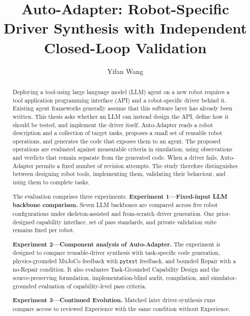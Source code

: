 \makeatletter
\renewcommand {\@degree@string} {Master of Science}
\makeatother

\title{Auto-Adapter: Robot-Specific Driver Synthesis with Independent Closed-Loop Validation}
\author{Yifan Wang}

\maketitle
\makedeclaration

\begin{abstract}
Deploying a tool-using large language model (LLM) agent on a new robot requires
a tool application programming interface (API) and a robot-specific driver
behind it. Existing agent frameworks generally assume that this software layer
has already been written. This thesis asks whether an LLM can instead design
the API, define how it should be tested, and implement the driver itself.
Auto-Adapter reads a robot description and a collection of target tasks,
proposes a small set of reusable robot operations, and generates the code that
exposes them to an agent. The proposed operations are evaluated against
measurable criteria in simulation, using observations and verdicts that remain
separate from the generated code. When a driver fails, Auto-Adapter permits a
fixed number of revision attempts. The study therefore distinguishes between
designing robot tools, implementing them, validating their behaviour, and
using them to complete tasks.

The evaluation comprises three experiments.
\textbf{Experiment 1---Fixed-input LLM backbone comparison.} Seven LLM
backbones are compared across five robot configurations under skeleton-assisted
and from-scratch driver generation. One prior-designed capability interface,
set of pass standards, and private validation suite remains fixed per robot.

\textbf{Experiment 2---Component analysis of Auto-Adapter.} The experiment is
designed to compare reusable-driver synthesis with task-specific code
generation, physics-grounded MuJoCo feedback with \texttt{pytest} feedback, and
bounded Repair with a no-Repair condition. It also evaluates Task-Grounded
Capability Design and the source-preserving formulation, implementation-blind
audit, compilation, and simulator-grounded evaluation of capability-level pass
criteria.

\textbf{Experiment 3---Continued Evolution.} Matched later driver-synthesis
runs compare access to reviewed Experience with the same condition without
Experience.


\end{abstract}
